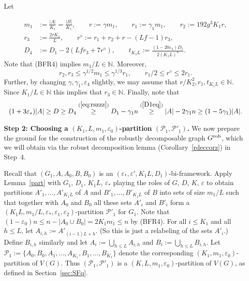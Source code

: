 \documentclass{memo-l}
\def\COMMENT#1{}
\def\cP{\mathcal{P}}
\def\eps{\varepsilon}
\def\epszero{\eps_0}
\numberwithin{section}{chapter}
\numberwithin{equation}{section}
\numberwithin{firstthm}{section}
\numberwithin{figure}{section}
\begin{document}
{Let%
     \COMMENT{$r^\diamond$ is $t$ in the $2$-clique case}
\begin{align*}
m_1 & :=\frac{|A|}{K_1}=\frac{|B|}{K_1}, \qquad r:=  \gamma m_1, \qquad
r_1 := \gamma_1 m_1, \qquad
r_2:= 192g^3K_1r, \\
r_3 & := \frac{2rK_1}{L}, \qquad r^\diamond := r_1 +r_2 +r -(Lf -1)r_3, \\
D_4 & :=D_1-2(Lfr_3+7r^\diamond), \qquad t_{K_1L} :=\frac{(1-20\eps_4)D_1}{2(K_1L)^4} .
\end{align*}
Note that (BFR4) implies $m_1/L\in \mathbb{N}$. Moreover, 
\begin{equation}\label{eq:rszzz}
r_2,r_3\le \gamma^{1/2}m_1\le \gamma^{1/3} r_1,  \qquad  r_1/2\le r^\diamond\le 2r_1.
\end{equation}
Further, by changing $\gamma,\gamma_1,\eps_4$ slightly, we may assume that $r/K^2_2,r_1,t_{K_1L}\in\mathbb{N}$.
Since $K_1/L\in\mathbb{N}$ this implies that $r_3\in\mathbb{N}$.
Finally, note that 
\begin{equation} \label{D4bound}
(1+3\eps_*)|A| \ge D \ge D_4  \stackrel{(\ref{eq:rszzz})}{\ge} D_1-\gamma_1 n \stackrel{(\ref{D1eq})}{\ge} |A|-2\gamma_1 n \ge (1-5\gamma_1)|A|.
\end{equation}


\noindent\textbf{Step 2: Choosing a $(K_1, L, m_1, \epszero)$-partition $(\mathcal{P}_1,\mathcal{P}'_1)$.}
We now prepare the ground for the construction of the robustly decomposable graph $G^{\rm rob}$, 
which we will obtain via the robust decomposition lemma (Corollary~\ref{rdeccorz}) in Step~4.

Recall that $(G_1,A,A_0,B,B_0)$ is an $(\eps_*,\eps',K_1L,D_1)$-bi-framework.
Apply Lem\-ma~\ref{part} with $G_1$, $D_1$, $K_1L$, $\eps_*$ playing the roles of $G$, $D$, $K$, $\eps$ to obtain partitions
$A'_1,\dots,A'_{K_1L}$ of $A$ and $B'_1,\dots,B'_{K_1L}$ of $B$
into sets of size $m_1/L$ such that together with $A_0$ and $B_0$ all
these sets $A'_i$ and $B'_i$ form a $(K_1L,m_1/L,\eps_*,\eps_1,\eps_2)$-partition
$\cP'_1$ for $G_1$. 
Note that $(1-\eps_0)n\le n-|A_0\cup B_0|=2K_1m_1\le n$ by (BFR4).
For all $i\le K_1$ and all $h\le L$, let $A_{i,h}:=A'_{(i-1)L+h}$. (So this is just a relabeling of the sets $A'_i$.)
Define $B_{i,h}$ similarly and let
$A_i:= \bigcup_{h\le L} A_{i,h}$ and $B_i:= \bigcup_{h\le L} B_{i,h}$.
Let $\cP_1:=\{A_0,B_0,A_1,\dots,A_{K_1},B_1,\dots,B_{K_1}\}$ denote the
corresponding $(K_1,m_1,\eps_0)$-partition of $V(G)$. Thus $(\cP_1,\cP'_1)$ is a $(K,L,m_1,\eps_0)$-partition of $V(G)$,
as defined in Section~\ref{sec:SFq}.
 
}
\end{document}
